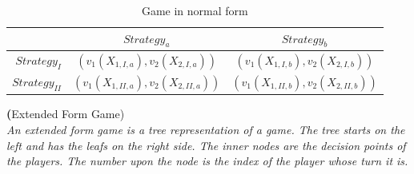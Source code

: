 \begin{table}[htb]
\centering
 \renewcommand{\arraystretch}{1.2} 
\begin{tabular}{c|c|c|}
\cline{2-3}
&\multicolumn{1}{|c|}{$Strategy_a$}& {$Strategy_b$}\\
\hline
\multicolumn{1}{|r|}{$Strategy_I$}&$\left(v_1(X_{1,I,a}), v_2(X_{2,I,a}) \right)$&$\left(v_1(X_{1,I,b}), v_2(X_{2,I,b}) \right)$\\
\hline
\multicolumn{1}{|r|}{$Strategy_{II}$}&$\left(v_1(X_{1,II,a}), v_2(X_{2,II,a}) \right)$&$\left(v_1(X_{1,II,b}), v_2(X_{2,II,b}) \right)$\\
\hline
\end{tabular}
\caption{Game in normal form}\label{Table0}
\end{table}

\begin{defi}\textbf({Extended Form Game)}\\
\emph{An \emph{extended form game} is a tree representation of a game. The tree starts on the left and has the leafs on the right side. The inner nodes are the decision points of the players. The number upon the node is the index of the player whose turn it is.}
\end{defi}
